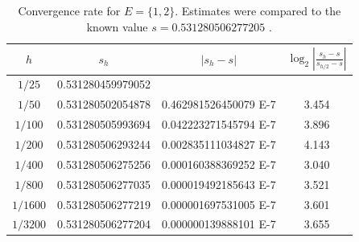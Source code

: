 \documentclass[10pt]{article}
\theoremstyle{definition}
\numberwithin{equation}{section}
\numberwithin{figure}{section}
\numberwithin{table}{section}
\begin{document}

\begin{table}
\centering
\begin{tabular}{c|ccc}
$h$&$s_h$&$|s_h-s|$&$\log_2\left|\frac{s_h-s}{s_{h/2}-s}\right|$\\\hline
$1/25$ & 0.531280459979052 &  & \\
$1/50$ & 0.531280502054878 & 0.462981526450079 E-7  & 3.454 \\
$1/100$ & 0.531280505993694 & 0.042223271545794 E-7  & 3.896 \\
$1/200$ & 0.531280506293244 & 0.002835111034827 E-7  & 4.143  \\
$1/400$ & 0.531280506275256 & 0.000160388369252 E-7  & 3.040\\
$1/800$ & 0.531280506277035 & 0.000019492185643 E-7  & 3.521 \\
$1/1600$ & 0.531280506277219 & 0.000001697531005 E-7  & 3.601 \\
$1/3200$ & 0.531280506277204 & 0.000000139888101 E-7 & 3.655 \\
\end{tabular}
\caption{Convergence rate for $E=\{1,2\}$. Estimates were compared to the known value $s= 0.531 280 506 277 205$ \cite{pollicott2022hausdorff}.}
\label{table:conv12}
\end{table}
\end{document}
